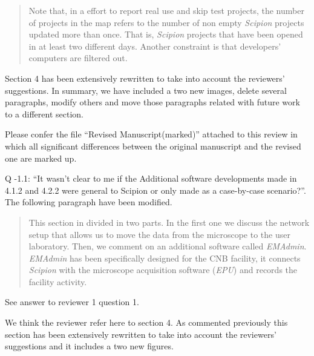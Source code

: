 \documentclass[a4paper,12pt]{article}
\def\cnb{CNB\xspace}
\def\scipion{\textit{Scipion}\xspace}
\def\emadmin{\textit{EMAdmin}\xspace}
\def\epu{\textit{EPU}\xspace}
\def\cnb{CNB\xspace}
\begin{document}
\begin{reviewer}
\begin{quote}
Note that, in a effort to report real use and skip test projects, the number of projects in the map refers to the number of non empty \scipion projects updated more than once. That is, 
\scipion projects that have been opened in at least two different days. Another constraint is that developers' computers are filtered out.
\end{quote}



\reply Section 4 has been extensively rewritten to take into account the reviewers' suggestions. In summary, we have included a two new images, delete several paragraphs, modify others and move those paragraphs related with future work to a different section.

Please confer the file ``Revised Manuscript(marked)'' attached to this review in which 
all significant differences between the original manuscript and the revised one are marked up.

Q \the\numexpr\value{pointcounter}-1\relax.1: ``It wasn't clear to me if the Additional software developments made in 4.1.2 and 4.2.2 were general to Scipion or only made as a case-by-case scenario?''. The following paragraph have been modified.

\begin{quote}
 This section in divided in two parts. In the first one we discuss the network setup that allows us to move the data from the microscope to the user laboratory. Then,  we comment on an additional software called  \emadmin. \emadmin has been specifically designed for the \cnb facility, it connects \scipion with the microscope acquisition software (\epu) and records the facility activity.
\end{quote}



\reply See answer to reviewer 1 question 1. 


\reply We think the reviewer refer here to section 4. As commented previously this section has been extensively rewritten to take into account the reviewers' suggestions and it includes a two new figures.

\end{reviewer}
\end{document}
